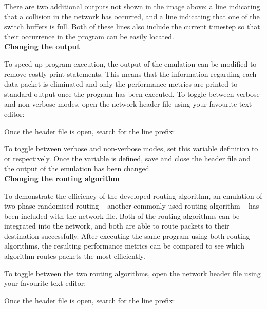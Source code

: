 \documentclass[a4paper, 12pt]{article}
\begin{document}
\noindent There are two additional outputs not shown in the image above: a line indicating that a collision in the network has occurred, and a line indicating that one of the switch buffers is full. Both of these lines also include the current timestep so that their occurrence in the program can be easily located. \\

\noindent\textbf{Changing the output}

\noindent To speed up program execution, the output of the emulation can be modified to remove costly print statements. This means that the information regarding each data packet is eliminated and only the performance metrics are printed to standard output once the program has been executed. To toggle between verbose and non-verbose modes, open the network header file using your favourite text editor:

{}

\newpage
\noindent Once the header file is open, search for the line prefix:

{}

\noindent To toggle between verbose and non-verbose modes, set this variable definition to {} or {} respectively. Once the variable is defined, save and close the header file and the output of the emulation has been changed.\\

\noindent\textbf{Changing the routing algorithm}

\noindent To demonstrate the efficiency of the developed routing algorithm, an emulation of two-phase randomised routing -- another commonly used routing algorithm -- has been included with the network file. Both of the routing algorithms can be integrated into the network, and both are able to route packets to their destination successfully. After executing the same program using both routing algorithms, the resulting performance metrics can be compared to see which algorithm routes packets the most efficiently.

\noindent To toggle between the two routing algorithms, open the network header file using your favourite text editor:

{}

\noindent Once the header file is open, search for the line prefix:

{}
\end{document}
